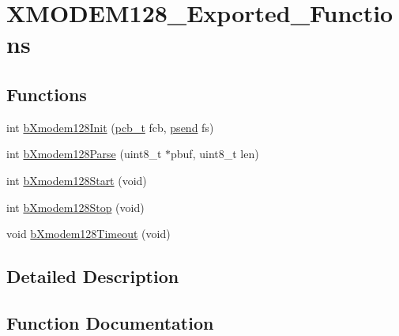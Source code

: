 \hypertarget{group___x_m_o_d_e_m128___exported___functions}{}\section{X\+M\+O\+D\+E\+M128\+\_\+\+Exported\+\_\+\+Functions}
\label{group___x_m_o_d_e_m128___exported___functions}
\subsection*{Functions}
\begin{DoxyCompactItemize}
\item 
int \mbox{\hyperlink{group___x_m_o_d_e_m128___exported___functions_ga75c122d0178d1616612a6d8e053ab3f4}{b\+Xmodem128\+Init}} (\mbox{\hyperlink{group___x_m_o_d_e_m128___exported___types_definitions_ga1189ecafb71f5108788e9d2e7ac5e7f3}{pcb\+\_\+t}} fcb, \mbox{\hyperlink{group___x_m_o_d_e_m128___exported___types_definitions_gad6ebbc53d3047463033cb2b686f40d66}{psend}} fs)
\item 
int \mbox{\hyperlink{group___x_m_o_d_e_m128___exported___functions_ga22d59aa816e006be041442488ea8539c}{b\+Xmodem128\+Parse}} (uint8\+\_\+t $\ast$pbuf, uint8\+\_\+t len)
\item 
int \mbox{\hyperlink{group___x_m_o_d_e_m128___exported___functions_ga2999eae8ddb0eead2907b9e031e8f0cd}{b\+Xmodem128\+Start}} (void)
\item 
int \mbox{\hyperlink{group___x_m_o_d_e_m128___exported___functions_ga09d8f1bd999f46b6c639fca0b651c08d}{b\+Xmodem128\+Stop}} (void)
\item 
void \mbox{\hyperlink{group___x_m_o_d_e_m128___exported___functions_gac0d4745672830bff370171057109399d}{b\+Xmodem128\+Timeout}} (void)
\end{DoxyCompactItemize}


\subsection{Detailed Description}


\subsection{Function Documentation}
\mbox{\label{group___x_m_o_d_e_m128___exported___functions_ga75c122d0178d1616612a6d8e053ab3f4}} 
